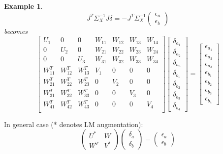 \documentclass[10pt]{article}         %
\newtheorem{exmp}{Example}[section]
\begin{document}
\begin{exmp}
\begin{equation}
  J^T\Sigma^{-1}_XJ\delta = -J^T\Sigma^{-1}_X\begin{pmatrix}\epsilon_a\\ \epsilon_b\end{pmatrix}
\end{equation}
becomes
\begin{equation}
  \begin{bmatrix}
    U_1 &0 &0 &W_{11} &W_{12} &W_{13} &W_{14}\\
    0 &U_2 &0 &W_{21} &W_{22} &W_{23} &W_{24}\\
    0 &0 &U_3 &W_{31} &W_{32} &W_{33} &W_{34}\\
    W_{11}^T &W_{12}^T &W_{13}^T &V_1 &0 &0 &0\\
    W_{21}^T &W_{22}^T &W_{23}^T &0 &V_2 &0 &0\\
    W_{31}^T &W_{32}^T &W_{33}^T &0 &0 &V_3 &0\\
    W_{41}^T &W_{42}^T &W_{43}^T &0 &0 &0 &V_4\\
  \end{bmatrix}
  \begin{bmatrix}
    \delta_{a_1}\\ \delta_{a_2}\\ \delta_{a_3}\\ \delta_{b_1}\\
    \delta_{b_2}\\ \delta_{b_3}\\ \delta_{b_4}
  \end{bmatrix}
  =
  \begin{bmatrix}
    \epsilon_{a_1}\\ \epsilon_{a_2}\\ \epsilon_{a_3}\\
    \epsilon_{b_1}\\ \epsilon_{b_2}\\ \epsilon_{b_3}\\ \epsilon_{b_4}
  \end{bmatrix}
\end{equation}
\end{exmp}
In general case (* denotes LM augmentation):
\begin{equation}
  \begin{pmatrix}
    U^*& W\\
    W^T& V^*
  \end{pmatrix}
  \begin{pmatrix}\delta_a\\ \delta_b\end{pmatrix} = \begin{pmatrix}\epsilon_a\\ \epsilon_b\end{pmatrix}
\end{equation}
\end{document}
